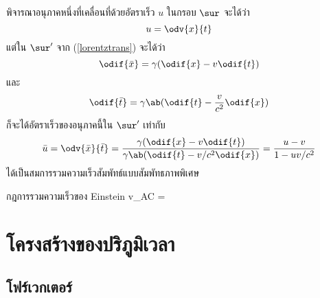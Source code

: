 พิจารณาอนุภาคหนึ่งที่เคลื่อนที่ด้วยอัตราเร็ว $u$ ในกรอบ $\sur$ จะได้ว่า
\[
u = \odv{x}{t}
\]
แต่ใน $\sur'$ จาก (\ref{lorentztrans}) จะได้ว่า
\[
\odif{\bar{x}} = \gamma(\odif{x} - v\odif{t})
\]
และ
\[
\odif{\bar{t}} = \gamma\ab(\odif{t} - \frac{v}{c^2}\odif{x})
\]
ก็จะได้อัตราเร็วของอนุภาคนี้ใน $\sur'$ เท่ากับ
\[
\bar{u} = \odv{\bar{x}}{\bar{t}} = \frac{\gamma(\odif{x} - v\odif{t})}{\gamma\ab(\odif{t} - v/c^2\odif{x})} = \frac{u - v}{1 - uv/c^2}
\]
ได้เป็นสมการรวมความเร็วสัมพัทธ์แบบสัมพัทธภาพพิเศษ
\begin{eqbox}{กฎการรวมความเร็วของ Einstein}
    v_{AC} = \label{einsvelo}
\end{eqbox} 

\section{โครงสร้างของปริภูมิเวลา}

\subsection{โฟร์เวกเตอร์}

